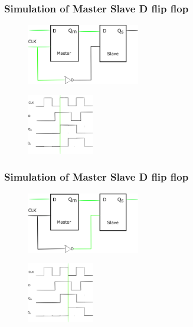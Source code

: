 \documentclass{beamer}
\begin{document}
\begin{frame}
\frametitle{Simulation of Master Slave D flip flop}
\begin{figure}[h]
    \includegraphics[width=.7\textwidth,height=100px]{name/path4.png}
\end{figure}
\begin{figure}[h]
    \includegraphics[width=.7\textwidth,height=100px]{name/clk4.png}
\end{figure}
\end{frame}

\begin{frame}
\frametitle{Simulation of Master Slave D flip flop}
\begin{figure}[h]
    \includegraphics[width=.7\textwidth,height=100px]{name/path5.png}
\end{figure}
\begin{figure}[h]
    \includegraphics[width=.7\textwidth,height=100px]{name/clk5.png}
\end{figure}
\end{frame}
\end{document}
